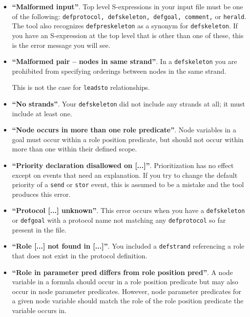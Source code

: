 \begin{itemize}
  Association lists are lists of S-expressions, each of which is a
  list that starts with a symbol.  This error would occur if you had,
  for instance, a symbol or a number, or an S-expression starting with
  a number as an input to a \texttt{defrole} or \texttt{defskeleton}.

\item \textbf{``Malformed input''}.  Top level S-expressions in your
  input file must be one of the following: \texttt{defprotocol,
    defskeleton, defgoal, comment,} or \texttt{herald}.  The tool also
  recognizes \texttt{defpreskeleton} as a synonym for
  \texttt{defskeleton}.  If you have an S-expression at the top level
  that is other than one of these, this is the error message you will
  see.

\item \textbf{``Malformed pair -- nodes in same strand''}.  In a
  \texttt{defskeleton} you are prohibited from specifying orderings
  between nodes in the same strand.

  This is not the case for \texttt{leadsto} relationships.

\item \textbf{``No strands''}.  Your \texttt{defskeleton} did not include
  any strands at all; it must include at least one.

\item \textbf{``Node occurs in more than one role predicate''}.  Node
  variables in a goal must occur within a role position predicate, but
  should not occur within more than one within their defined scope.

\item \textbf{``Priority declaration disallowed on [...]''}.
  Prioritization has no effect except on events that need an
  explanation.  If you try to change the default priority of a
  \texttt{send} or \texttt{stor} event, this is assumed to be a
  mistake and the tool produces this error.

\item \textbf{``Protocol [...] unknown''}.  This error occurs when you
  have a \texttt{defskeleton} or \texttt{defgoal} with a protocol name
  not matching any \texttt{defprotocol} so far present in the file.

\item \textbf{``Role [...] not found in [...]''}.  You included a
  \texttt{defstrand} referencing a role that does not exist in the
  protocol definition.

\item \textbf{``Role in parameter pred differs from role position
  pred''}.  A node variable in a formula should occur in a role
  position predicate but may also occur in node parameter predicates.
  However, node parameter predicates for a given node variable should
  match the role of the role position predicate the variable occurs
  in.


\end{itemize}
